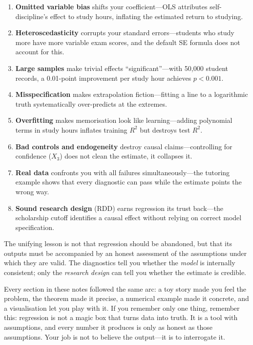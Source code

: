 \documentclass[11pt,a4paper]{article}
\theoremstyle{definition}
\theoremstyle{plain}
\theoremstyle{remark}
\begin{document}
\begin{enumerate}[nosep]
  \item \textbf{Omitted variable bias} shifts your coefficient---OLS attributes self-discipline's effect to study hours, inflating the estimated return to studying.
  \item \textbf{Heteroscedasticity} corrupts your standard errors---students who study more have more variable exam scores, and the default SE formula does not account for this.
  \item \textbf{Large samples} make trivial effects ``significant''---with 50{,}000 student records, a 0.01-point improvement per study hour achieves $p < 0.001$.
  \item \textbf{Misspecification} makes extrapolation fiction---fitting a line to a logarithmic truth systematically over-predicts at the extremes.
  \item \textbf{Overfitting} makes memorisation look like learning---adding polynomial terms in study hours inflates training $R^2$ but destroys test $R^2$.
  \item \textbf{Bad controls and endogeneity} destroy causal claims---controlling for confidence ($X_3$) does not clean the estimate, it collapses it.
  \item \textbf{Real data} confronts you with all failures simultaneously---the tutoring example shows that every diagnostic can pass while the estimate points the wrong way.
  \item \textbf{Sound research design} (RDD) earns regression its trust back---the scholarship cutoff identifies a causal effect without relying on correct model specification.
\end{enumerate}

The unifying lesson is not that regression should be abandoned, but that its outputs must be accompanied by an honest assessment of the assumptions under which they are valid.
The diagnostics tell you whether the \emph{model} is internally consistent; only the \emph{research design} can tell you whether the estimate is credible.

\begin{keyinsight}
Every section in these notes followed the same arc: a toy story made you feel the problem, the theorem made it precise, a numerical example made it concrete, and a visualisation let you play with it. If you remember only one thing, remember this: regression is not a magic box that turns data into truth. It is a tool with assumptions, and every number it produces is only as honest as those assumptions. Your job is not to believe the output---it is to interrogate it.
\end{keyinsight}
\end{document}

